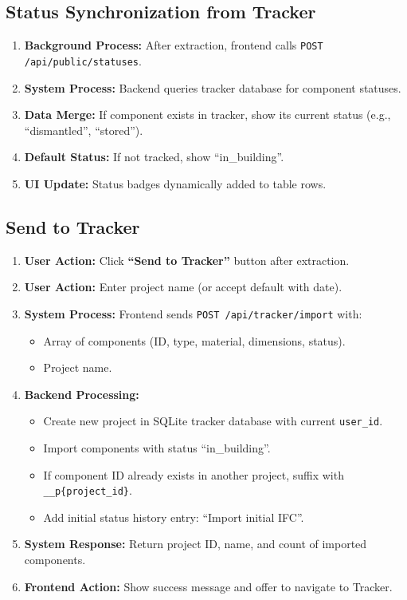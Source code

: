 \documentclass[11pt,a4paper]{article}
\begin{document}
\subsection{Status Synchronization from Tracker}

\begin{enumerate}[leftmargin=*]
    \item \textbf{Background Process:} After extraction, frontend calls \texttt{POST /api/public/statuses}.
    \item \textbf{System Process:} Backend queries tracker database for component statuses.
    \item \textbf{Data Merge:} If component exists in tracker, show its current status (e.g., ``dismantled'', ``stored'').
    \item \textbf{Default Status:} If not tracked, show ``in\_building''.
    \item \textbf{UI Update:} Status badges dynamically added to table rows.
\end{enumerate}

\subsection{Send to Tracker}

\begin{enumerate}[leftmargin=*]
    \item \textbf{User Action:} Click \textbf{``Send to Tracker''} button after extraction.
    \item \textbf{User Action:} Enter project name (or accept default with date).
    \item \textbf{System Process:} Frontend sends \texttt{POST /api/tracker/import} with:
        \begin{itemize}
            \item Array of components (ID, type, material, dimensions, status).
            \item Project name.
        \end{itemize}
    \item \textbf{Backend Processing:}
        \begin{itemize}
            \item Create new project in SQLite tracker database with current \texttt{user\_id}.
            \item Import components with status ``in\_building''.
            \item If component ID already exists in another project, suffix with \texttt{\_\_p\{project\_id\}}.
            \item Add initial status history entry: ``Import initial IFC''.
        \end{itemize}
    \item \textbf{System Response:} Return project ID, name, and count of imported components.
    \item \textbf{Frontend Action:} Show success message and offer to navigate to Tracker.
\end{enumerate}
\end{document}
